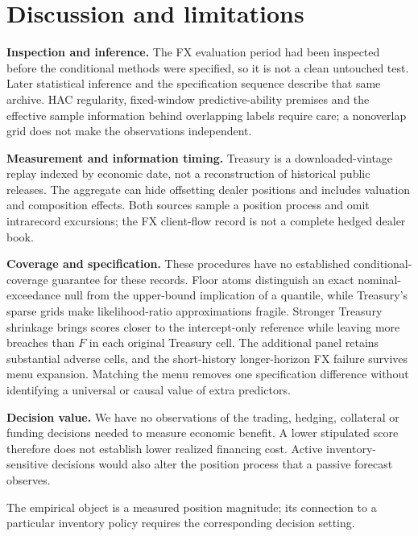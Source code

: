 \section{Discussion and limitations}\label{sec:limits}
\textbf{Inspection and inference.} The FX evaluation period had been inspected before the conditional methods were specified, so it is not a clean untouched test. Later statistical inference and the specification sequence describe that same archive. HAC regularity, fixed-window predictive-ability premises and the effective sample information behind overlapping labels require care; a nonoverlap grid does not make the observations independent.

\textbf{Measurement and information timing.} Treasury is a downloaded-vintage replay indexed by economic date, not a reconstruction of historical public releases. The aggregate can hide offsetting dealer positions and includes valuation and composition effects. Both sources sample a position process and omit intrarecord excursions; the FX client-flow record is not a complete hedged dealer book.

\textbf{Coverage and specification.} These procedures have no established conditional-coverage guarantee for these records. Floor atoms distinguish an exact nominal-exceedance null from the upper-bound implication of a quantile, while Treasury's sparse grids make likelihood-ratio approximations fragile. Stronger Treasury shrinkage brings scores closer to the intercept-only reference while leaving more breaches than $F$ in each original Treasury cell. The additional panel retains substantial adverse cells, and the short-history longer-horizon FX failure survives menu expansion. Matching the menu removes one specification difference without identifying a universal or causal value of extra predictors.

\textbf{Decision value.} We have no observations of the trading, hedging, collateral or funding decisions needed to measure economic benefit. A lower stipulated score therefore does not establish lower realized financing cost. Active inventory-sensitive decisions would also alter the position process that a passive forecast observes.

The empirical object is a measured position magnitude; its connection to a particular inventory policy requires the corresponding decision setting.

